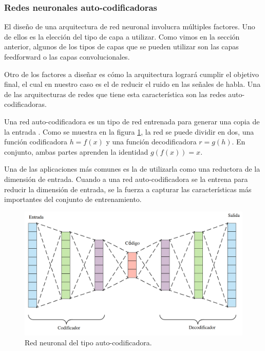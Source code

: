 \subsubsection{Redes neuronales auto-codificadoras}

El diseño de una arquitectura de red neuronal involucra múltiples factores. Uno de ellos es la elección del tipo de capa a utilizar. Como vimos en la sección anterior, algunos de los tipos de capas que se pueden utilizar son las capas feedforward o las capas convolucionales. 

Otro de los factores a diseñar es cómo la arquitectura logrará cumplir el objetivo final, el cual en nuestro caso es el de reducir el ruido en las señales de habla. Una de las arquitecturas de redes que tiene esta característica son las redes auto-codificadoras.

Una red auto-codificadora es un tipo de red entrenada para generar una copia de la entrada \cite{deep_learning}. Como se muestra en la figura \ref{fig:ch3_autoencoder}, la red se puede dividir en dos, una función codificadora $h=f(x)$ y una función decodificadora $r=g(h)$. En conjunto, ambas partes aprenden la identidad $g(f(x)) = x$.

Una de las aplicaciones más comunes es la de utilizarla como una reductora de la dimensión de entrada. Cuando a una red auto-codificadora se la entrena para reducir la dimensión de entrada, se la fuerza a capturar las características más importantes del conjunto de entrenamiento.

\begin{figure}
	\centering
	\centerline{\includegraphics[scale=0.2]{images/ch3/autoencoder.png}}
	\caption{Red neuronal del tipo auto-codificadora.}
	\label{fig:ch3_autoencoder}
\end{figure}

